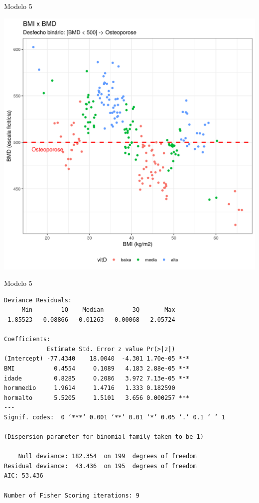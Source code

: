 \documentclass{beamer}
\begin{document}
\begin{frame}{\small Modelo 5}
  \begin{center}
    \includegraphics[height=.9\textheight]{Cap31-32/pratica-glm5}
  \end{center}
\end{frame}

\begin{frame}[fragile]{}
  \begin{center}
    \begin{exampleblock}{Modelo 5}
      \tiny
\begin{verbatim}
Deviance Residuals: 
     Min        1Q    Median        3Q       Max  
-1.85523  -0.08866  -0.01263  -0.00068   2.05724  

Coefficients:
            Estimate Std. Error z value Pr(>|z|)    
(Intercept) -77.4340    18.0040  -4.301 1.70e-05 ***
BMI           0.4554     0.1089   4.183 2.88e-05 ***
idade         0.8285     0.2086   3.972 7.13e-05 ***
hormmedio     1.9614     1.4716   1.333 0.182590    
hormalto      5.5205     1.5101   3.656 0.000257 ***
---
Signif. codes:  0 ‘***’ 0.001 ‘**’ 0.01 ‘*’ 0.05 ‘.’ 0.1 ‘ ’ 1

(Dispersion parameter for binomial family taken to be 1)

    Null deviance: 182.354  on 199  degrees of freedom
Residual deviance:  43.436  on 195  degrees of freedom
AIC: 53.436

Number of Fisher Scoring iterations: 9
\end{verbatim}
    \end{exampleblock}
  \end{center}
\end{frame}
\end{document}
